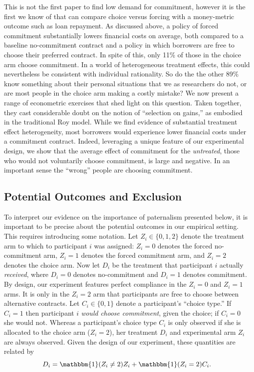 \documentclass[oneside,11pt]{article}
\begin{document}
This is not the first paper to find low demand for commitment, however it is the first we know of that can compare choice versus forcing with a money-metric outcome such as loan repayment. As discussed above, a policy of forced commitment substantially lowers financial costs on average, both compared to a baseline no-commitment contract and a policy in which borrowers are free to choose their preferred contract. In spite of this, only 11\% of those in the choice arm choose commitment. In a world of heterogeneous treatment effects, this could nevertheless be consistent with individual rationality. So do the the other 89\% know something about their personal situations that we as researchers do not, or are most people in the choice arm making a costly mistake? We now present a range of econometric exercises that shed light on this question. Taken together, they cast considerable doubt on the notion of ``selection on gains,'' as embodied in the traditional Roy model. While we find evidence of substantial treatment effect heterogeneity, most borrowers would experience lower financial costs under a commitment contract. Indeed, leveraging a unique feature of our experimental design, we show that the average effect of commitment for the \emph{untreated}, those who would not voluntarily choose commitment, is large and negative. In an important sense the ``wrong'' people are choosing commitment.


\subsection{Potential Outcomes and Exclusion}

To interpret our evidence on the importance of paternalism presented below, it is important to be precise about the potential outcomes in our empirical setting. This requires introducing some notation. Let $Z_i \in \{0, 1, 2\}$ denote the treatment arm to which to participant $i$ was assigned: $Z_i = 0$ denotes the forced no-commitment arm, $Z_i = 1$ denotes the forced commitment arm, and $Z_i = 2$ denotes the choice arm. Now let $D_i$ be the treatment that participant $i$ actually \emph{received}, where $D_i = 0$ denotes no-commitment and $D_i = 1$ denotes commitment. By design, our experiment features perfect compliance in the $Z_i = 0$ and $Z_i = 1$ arms. It is only in the $Z_i = 2$ arm that participants are free to choose between alternative contracts. Let $C_i \in \{0, 1 \}$ denote a participant's ``choice type.'' If $C_i = 1$ then participant $i$ \emph{would choose commitment}, given the choice; if $C_i = 0$ she would not. Whereas a participant's choice type $C_i$ is only observed if she is allocated to the choice arm ($Z_i = 2$), her treatment $D_i$ and experimental arm $Z_i$ are always observed. Given the design of our experiment, these quantities are related by
\begin{equation}
D_i = \mathbbm{1}(Z_i \neq 2) Z_i + \mathbbm{1}(Z_i = 2) C_i.
\label{eq:potentialTreatments}
\end{equation}
\end{document}
